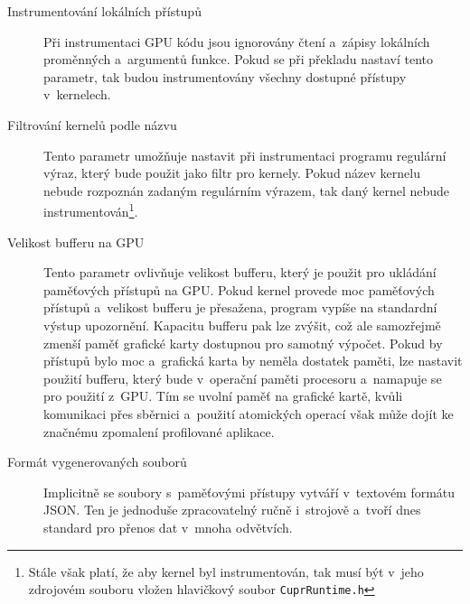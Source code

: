 \begin{description}
    \item[Instrumentování lokálních přístupů] Při instrumentaci GPU kódu jsou ignorovány čtení a~zápisy lokálních proměnných a~argumentů funkce. Pokud se při překladu nastaví tento parametr, tak budou instrumentovány všechny dostupné přístupy v~kernelech.
    \item[Filtrování kernelů podle názvu] Tento parametr umožňuje nastavit při instrumentaci programu regulární výraz, který bude použit jako filtr pro kernely. Pokud název kernelu nebude rozpoznán zadaným regulárním výrazem, tak daný kernel nebude instrumentován\footnote{Stále však platí, že aby kernel byl instrumentován, tak musí být v~jeho zdrojovém souboru vložen hlavičkový soubor \texttt{CuprRuntime.h}}.
    \item[Velikost bufferu na GPU] Tento parametr ovlivňuje velikost bufferu, který je použit pro ukládání paměťových přístupů na GPU. Pokud kernel provede moc paměťových přístupů a~velikost bufferu je přesažena, program vypíše na standardní výstup upozornění. Kapacitu bufferu pak lze zvýšit, což ale samozřejmě zmenší paměť grafické karty dostupnou pro samotný výpočet. Pokud by přístupů bylo moc a~grafická karta by neměla dostatek paměti, lze nastavit použití bufferu, který bude v~operační paměti procesoru a~namapuje se pro použití z~GPU. Tím se uvolní paměť na grafické kartě, kvůli komunikaci přes sběrnici a~použití atomických operací však může dojít ke značnému zpomalení profilované aplikace.
    \item[Formát vygenerovaných souborů] Implicitně se soubory s~paměťovými přístupy vytváří v~textovém formátu JSON. Ten je jednoduše zpracovatelný ručně i~strojově a~tvoří dnes standard pro přenos dat v~mnoha odvětvích.

\end{description}
